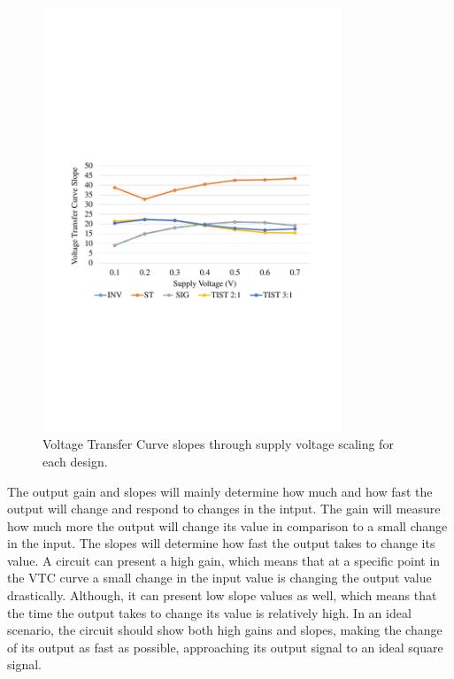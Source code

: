 \documentclass[pgmicro,diss,english]{iiufrgs}
\begin{document}
    \begin{figure}[h]
        \centering
            \includegraphics[width=0.8\textwidth, trim={1.25cm 9cm 2cm 10cm}, clip]{slopes.pdf}
            \caption{Voltage Transfer Curve slopes through supply voltage scaling for each design.}
        \label{fig:slopes}
    \end{figure}

The output gain and slopes will mainly determine how much and how fast the output will change and respond to changes in the intput. The gain will measure how much more the output will change its value in comparison to a small change in the input. The slopes will determine how fast the output takes to change its value. A circuit can present a high gain, which means that at a specific point in the VTC curve a small change in the input value is changing the output value drastically. Although, it can present low slope values as well, which means that the time the output takes to change its value is relatively high. In an ideal scenario, the circuit should show both high gains and slopes, making the change of its output as fast as possible, approaching its output signal to an ideal square signal.
\end{document}

